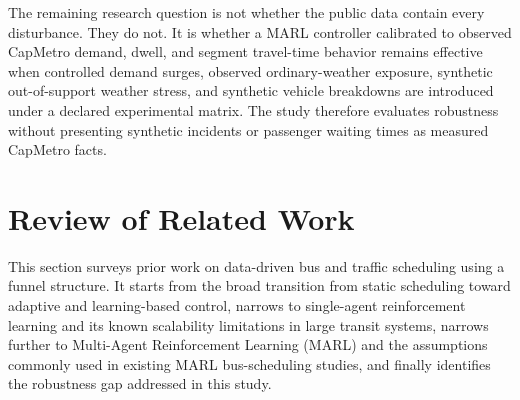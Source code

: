 The remaining research question is not whether the public data contain every disturbance. They do not. It is whether a MARL controller calibrated to observed CapMetro demand, dwell, and segment travel-time behavior remains effective when controlled demand surges, observed ordinary-weather exposure, synthetic out-of-support weather stress, and synthetic vehicle breakdowns are introduced under a declared experimental matrix. The study therefore evaluates robustness without presenting synthetic incidents or passenger waiting times as measured CapMetro facts.



\section{Review of Related Work}
This section surveys prior work on data-driven bus and traffic scheduling using a funnel structure. It starts from the broad transition from static scheduling toward adaptive and learning-based control, narrows to single-agent reinforcement learning and its known scalability limitations in large transit systems, narrows further to Multi-Agent Reinforcement Learning (MARL) and the assumptions commonly used in existing MARL bus-scheduling studies, and finally identifies the robustness gap addressed in this study.

